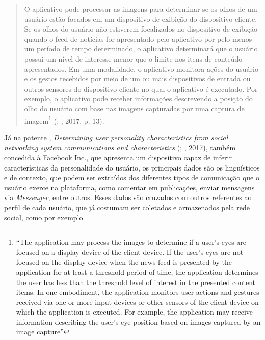 \begin{quote}
O aplicativo pode processar as imagens para determinar se os olhos de um
usuário estão focados em um dispositivo de exibição do dispositivo
cliente. Se os olhos do usuário não estiverem focalizados no dispositivo
de exibição quando o feed de notícias for apresentado pelo aplicativo
por pelo menos um período de tempo determinado, o aplicativo determinará
que o usuário possui um nível de interesse menor que o limite nos itens
de conteúdo apresentados. Em uma modalidade, o aplicativo monitora ações
do usuário e os gestos recebidos por meio de um ou mais dispositivos de
entrada ou outros sensores do dispositivo cliente no qual o aplicativo é
executado. Por exemplo, o aplicativo pode receber informações
descrevendo a posição do olho do usuário com base nas imagens capturadas
por uma captura de imagem\footnote{``The application may process the
  images to determine if a user's eyes are focused on a display device
  of the client device. If the user's eyes are not focused on the
  display device when the news feed is presented by the application for
  at least a threshold period of time, the application determines the
  user has less than the threshold level of interest in the presented
  content items. In one embodiment, the application monitors user
  actions and gestures received via one or more input devices or other
  sensors of the client device on which the application is executed. For
  example, the application may receive information describing the user's
  eye position based on images captured by an image capture''} (;
, 2017, p. 13).
\end{quote}

Já na patente , \emph{Determining user personality
characteristics from social networking system communications and
characteristics} (; , 2017), também concedida à
Facebook Inc., que apresenta um dispositivo capaz de inferir
características da personalidade do usuário, os principais dados são os
linguísticos e de contexto, que podem ser extraídos dos diferentes tipos
de comunicação que o usuário exerce na plataforma, como comentar em
publicações, enviar mensagens via \emph{Messenger}, entre outros. Esses
dados são cruzados com outros referentes ao perfil de cada usuário, que
já costumam ser coletados e armazenados pela rede social, como por
exemplo

